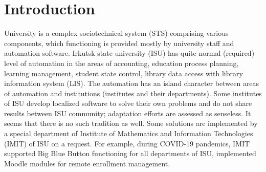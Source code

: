 \documentclass[
]{aiitart}
\begin{document}
\maketitle


\section{Introduction}

University is a complex sociotechnical system (STS) \cite{zh2020} comprising various components, which functioning is provided mostly by university staff and automation software.  Irkutsk state university (ISU) has quite normal (required) level of automation in the areas of accounting, education process planning, learning management, student state control, library data access with library information system (LIS).  The automation has an island character between areas of automation and institutions (institutes and their departments).  Some institutes of ISU develop localized software to solve their own problems and do not share results between ISU community; adaptation efforts are assessed as senseless. It seems that there is no such tradition as well.  Some solutions are implemented by a special department of Institute of Mathematics and Information Technologies (IMIT) of ISU on a request.  For example, during COVID-19 pandemics, IMIT supported Big Blue Button functioning for all departments of ISU, implemented Moodle modules for remote enrollment management.

\end{document}
